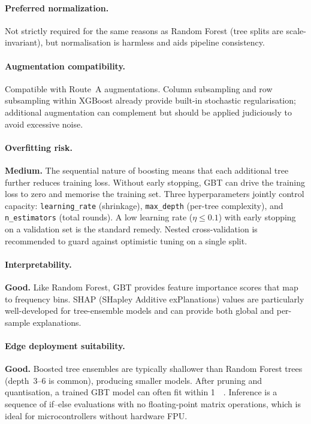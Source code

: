 \paragraph{Preferred normalization.}
Not strictly required for the same reasons as Random Forest (tree
splits are scale-invariant), but normalisation is harmless and aids
pipeline consistency.

\paragraph{Augmentation compatibility.}
Compatible with Route~A augmentations.  Column subsampling and row
subsampling within XGBoost already provide built-in stochastic
regularisation; additional augmentation can complement but should
be applied judiciously to avoid excessive noise.

\paragraph{Overfitting risk.}
\textbf{Medium.}  The sequential nature of boosting means that each
additional tree further reduces training loss.  Without early stopping,
GBT can drive the training loss to zero and memorise the training set.
Three hyperparameters jointly control capacity: \texttt{learning\_rate}
(shrinkage), \texttt{max\_depth} (per-tree complexity), and
\texttt{n\_estimators} (total rounds).  A low learning rate
($\eta \leq 0.1$) with early stopping on a validation set is the
standard remedy.  Nested cross-validation is recommended to guard
against optimistic tuning on a single split.

\paragraph{Interpretability.}
\textbf{Good.}  Like Random Forest, GBT provides feature importance
scores that map to frequency bins.  SHAP (SHapley Additive
exPlanations) values are particularly well-developed for
tree-ensemble models and can provide both global and per-sample
explanations.

\paragraph{Edge deployment suitability.}
\textbf{Good.}  Boosted tree ensembles are typically shallower than
Random Forest trees (depth~3--6 is common), producing smaller models.
After pruning and quantisation, a trained GBT model can often fit
within \SI{1}{\mega\byte}.  Inference is a sequence of if--else
evaluations with no floating-point matrix operations, which is ideal
for microcontrollers without hardware FPU.

